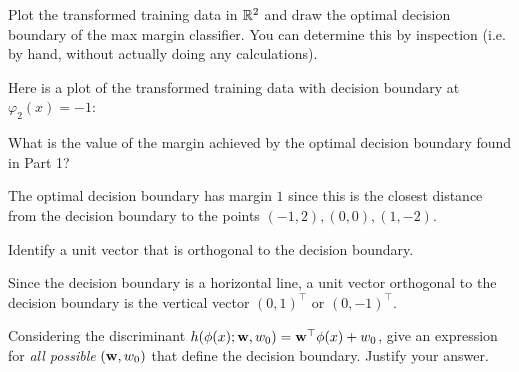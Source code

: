 \documentclass[expanded]{lkx_pset}
\begin{document}
\begin{parts}
	\begin{part}{1}
		Plot the transformed training data in $\mathbb{R}^2$ and draw the optimal decision boundary of the max margin classifier. You can determine this by inspection (i.e. by hand, without actually doing any calculations).
	\end{part}

	Here is a plot of the transformed training data with decision boundary at $\varphi_2(x) = -1$:
	\begin{center}
	\end{center}

	\begin{part}{2} What is the value of the margin achieved by the optimal
		decision boundary found in Part 1?
	\end{part}

	The optimal decision boundary has margin $1$ since this is the closest distance from the decision boundary to the points $(-1, 2), (0,0), (1,-2)$.

	\begin{part}{3} Identify a unit vector that is orthogonal to the decision boundary.
	\end{part}

	Since the decision boundary is a horizontal line, a unit vector orthogonal to the decision boundary is the vertical vector $(0,1)^\intercal$ or $(0,-1)^\intercal$.

	\begin{part}{4} Considering the discriminant $h(\mathbf{\phi}(x);\mathbf{w},w_0)=\mathbf{w}^\top\mathbf{\phi}(x) +w_0$,
		give an expression for {\em all possible} $(\mathbf{w},w_0)$ that define
		the decision boundary. Justify your answer.
	\end{part}


\end{parts}
\end{document}
